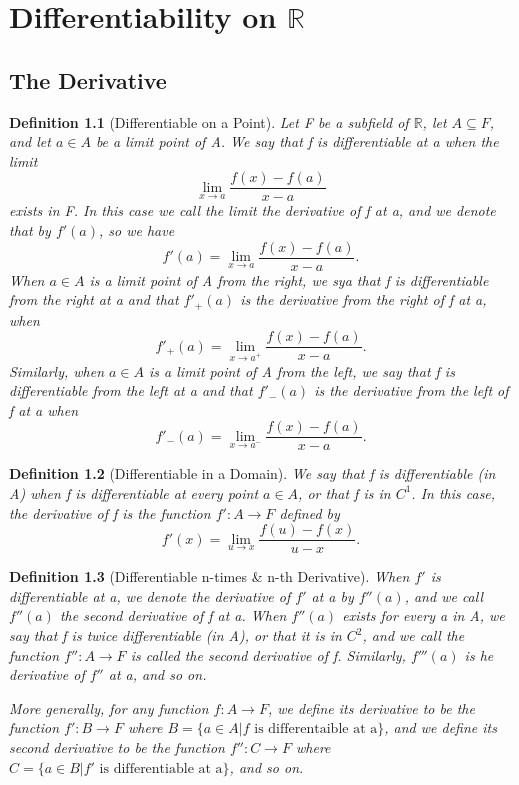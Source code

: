 \documentclass[11pt, oneside]{book}
\theoremstyle{break}
\newtheorem{defn}{Definition}[section]
\newcommand{\bb}[1]{\mathbb{#1}}			%
\begin{document}
\chapter{Differentiability on \texorpdfstring{$\bb{R}$}{R}}


\section{The Derivative}

\begin{defn}[Differentiable on a Point]
	Let F be a subfield of $\bb{R}$, let $A \subseteq F$, and let $a \in A$ be a limit point of A. We say that f is differentiable at a when the limit
	\[
		\lim_{x \to a} \frac{f(x) - f(a)}{x - a}
	\]
	exists in F. In this case we call the limit the derivative of f at a, and we denote that by $f'(a)$, so we have
	\[
		f'(a) = \lim_{x \to a} \frac{f(x) - f(a)}{x - a}.
	\]
	When $a \in A$ is a limit point of A from the right, we sya that f is differentiable from the right at a and that $f'_+(a)$ is the derivative from the right of f at a, when
	\[
		f'_+(a) = \lim_{x \to a^+} \frac{f(x) - f(a)}{x - a}.
	\]
	Similarly, when $a \in A$ is a limit point of A from the left, we say that f is differentiable from the left at a and that $f'_{-}(a)$ is the derivative from the left of f at a when
	\[
		f'_{-}(a) = \lim_{x \to a^-} \frac{f(x) - f(a)}{x - a}.
	\]
\end{defn}

\begin{defn}[Differentiable in a Domain]
	We say that f is differentiable (in A) when f is differentiable at every point $a \in A$, or that f is in $C^1$. In this case, the derivative of f is the function $f': A \to F$ defined by
	\[
		f'(x) = \lim_{u \to x} \frac{f(u) - f(x)}{u - x}.
	\]
\end{defn}

\begin{defn}[Differentiable n-times \& n-th Derivative]
	When $f'$ is differentiable at a, we denote the derivative of $f'$ at a by $f''(a)$, and we call $f''(a)$ the second derivative of f at a. When $f''(a)$ exists for every a in A, we say that f is twice differentiable (in A), or that it is in $C^2$, and we call the function $f'': A \to F$ is called the second derivative of f. Similarly, $f'''(a)$ is he derivative of $f''$ at a, and so on.

	More generally, for any function $f: A \to F$, we define its derivative to be the function $f': B \to F$ where $B = \{a \in A | f \text{ is differentaible at a}\}$, and we define its second derivative to be the function $f'': C \to F$ where $C = \{a \in B | f' \text{ is differentiable at a}\}$, and so on.
\end{defn}
\end{document}
